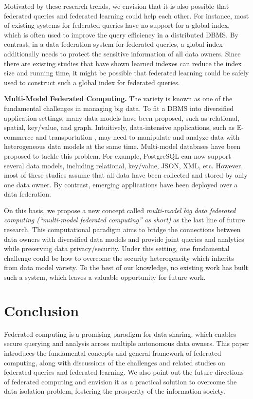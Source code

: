 \documentclass[11pt]{article}
\newcommand{\etc}{etc.\xspace}
\newcommand{\fakeparagraph}[1]{\vspace{1mm}\noindent\textbf{#1.}}
\begin{document}
Motivated by these research trends, we envision that it is also possible that federated queries and federated learning could help each other.
For instance, most of existing systems for federated queries have no support for a global index, which is often used to improve the query efficiency in a distributed DBMS.
By contrast, in a data federation system for federated queries, a global index additionally needs to protect the sensitive information of all data owners.
Since there are existing studies that have shown learned indexes can reduce the index size and running time, 
it might be possible that federated learning could be safely used to construct such a global index for federated queries.

\fakeparagraph{Multi-Model Federated Computing}
The variety is known as one of the fundamental challenges in managing big data. 
To fit a DBMS into diversified application settings, many data models have been proposed, such as relational, spatial, key/value, and graph.
Intuitively, data-intensive applications, such as E-commerce \cite{DBLP:journals/csur/LuH19} and transportation \cite{DBLP:conf/cikm/LuHC18}, may need to manipulate and analyze data with heterogeneous data models at the same time.
Multi-model databases \cite{DBLP:journals/csur/LuH19} have been proposed to tackle this problem. 
For example, PostgreSQL can now support several data models, including relational, key/value, JSON, XML, \etc 
However, most of these studies assume that all data have been collected and stored by only one data owner.
By contrast, emerging applications have been deployed over a data federation.

On this basis, we propose a new concept called \textit{multi-model big data federated computing (``multi-model federated computing'' as short)} as the last line of future research. This computational paradigm aims to bridge the connections between data owners with diversified data models and provide joint queries and analytics while preserving data privacy/security. Under this setting, one fundamental challenge could be how to overcome the security heterogeneity \cite{DBLP:conf/sigmod/0012FWY20} which inherits from data model variety. To the best of our knowledge, no existing work has built such a system, which leaves a valuable opportunity for future work.

\section{Conclusion}\label{sec:conclusion}
Federated computing is a promising paradigm for data sharing, which enables secure querying and analysis across multiple autonomous data owners. 
This paper introduces the fundamental concepts and general framework of federated computing, along with discussions of the challenges and related studies on federated queries and federated learning. 
We also point out the future directions of federated computing and envision it as a practical solution to overcome the data isolation problem, fostering the prosperity of the information society.
\end{document}
